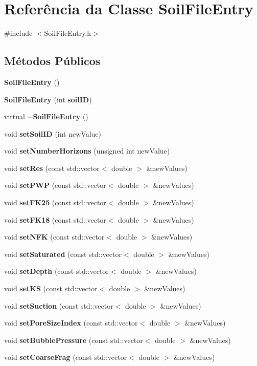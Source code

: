 \section{Referência da Classe Soil\+File\+Entry}
\label{class_soil_file_entry}


{\ttfamily \#include $<$Soil\+File\+Entry.\+h$>$}

\subsection*{Métodos Públicos}
\begin{DoxyCompactItemize}
\item 
{\bf Soil\+File\+Entry} ()
\item 
{\bf Soil\+File\+Entry} (int {\bf soil\+ID})
\item 
virtual {\bf $\sim$\+Soil\+File\+Entry} ()
\item 
void {\bf set\+Soil\+ID} (int new\+Value)
\item 
void {\bf set\+Number\+Horizons} (unsigned int new\+Value)
\item 
void {\bf set\+Res} (const std\+::vector$<$ double $>$ \&new\+Values)
\item 
void {\bf set\+P\+WP} (const std\+::vector$<$ double $>$ \&new\+Values)
\item 
void {\bf set\+F\+K25} (const std\+::vector$<$ double $>$ \&new\+Values)
\item 
void {\bf set\+F\+K18} (const std\+::vector$<$ double $>$ \&new\+Values)
\item 
void {\bf set\+N\+FK} (const std\+::vector$<$ double $>$ \&new\+Values)
\item 
void {\bf set\+Saturated} (const std\+::vector$<$ double $>$ \&new\+Values)
\item 
void {\bf set\+Depth} (const std\+::vector$<$ double $>$ \&new\+Values)
\item 
void {\bf set\+KS} (const std\+::vector$<$ double $>$ \&new\+Values)
\item 
void {\bf set\+Suction} (const std\+::vector$<$ double $>$ \&new\+Values)
\item 
void {\bf set\+Pore\+Size\+Index} (const std\+::vector$<$ double $>$ \&new\+Values)
\item 
void {\bf set\+Bubble\+Pressure} (const std\+::vector$<$ double $>$ \&new\+Values)
\item 
void {\bf set\+Coarse\+Frag} (const std\+::vector$<$ double $>$ \&new\+Values)
\item 

\end{DoxyCompactItemize}
